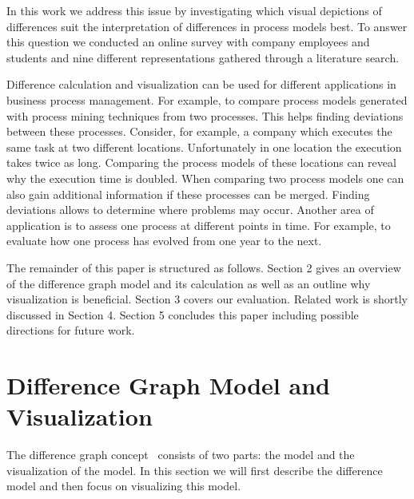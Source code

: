 \documentclass{llncs}
\begin{document}
In this work we address this issue by investigating which visual depictions of differences suit the interpretation of differences in process models best. To answer this question we conducted an online survey with company employees and students and nine different representations gathered through a literature search.

Difference calculation and visualization can be used for different applications in business process management. For example, to compare process models generated with process mining techniques from two processes. This helps finding deviations between these processes. Consider, for example, a company which executes the same task at two different locations. Unfortunately in one location the execution takes twice as long. Comparing the process models of these locations can reveal why the execution time is doubled. When comparing two process models one can also gain additional information if these processes can be merged. Finding deviations allows to determine where problems may occur. Another area of application is to assess one process at different points in time. For example, to evaluate how one process has evolved from one year to the next. 

The remainder of this paper is structured as follows. Section 2 gives an overview of the difference graph model and its calculation as well as an outline why visualization is beneficial. Section 3 covers our evaluation. Related work is shortly discussed in Section 4. Section 5 concludes this paper including possible directions for future work.




\section{Difference Graph Model and Visualization} %
\label{sec:DiffgraphModel}
The difference graph concept~\cite{lit:VisuApprDiffAnalysis} consists of two parts: the model and the visualization of the model. In this section we will first describe the difference model and then focus on visualizing this model.
\end{document}
